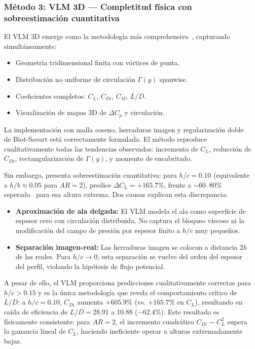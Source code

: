 \documentclass[twocolumn]{article}
\begin{document}
\subsubsection{Método 3: VLM 3D --- Completitud física con sobreestimación cuantitativa}

El VLM 3D emerge como la metodología más comprehensiva~\cite{katz2001}, capturando simultáneamente:

\begin{itemize}
\item Geometría tridimensional finita con vórtices de punta.
\item Distribución no uniforme de circulación $\Gamma(y)$ spanwise.
\item Coeficientes completos: $C_L$, $C_{Di}$, $C_M$, $L/D$.
\item Visualización de mapas 3D de $\Delta C_p$ y circulación.
\end{itemize}

La implementación con malla coseno, herraduras imagen y regularización doble de Biot-Savart está correctamente formulada. El método reproduce cualitativamente todas las tendencias observadas: incremento de $C_L$, reducción de $C_{Di}$, rectangularización de $\Gamma(y)$, y momento de encabritado.

Sin embargo, presenta sobreestimación cuantitativa: para $h/c = 0.10$ (equivalente a $h/b \approx 0.05$ para $AR = 2$), predice $\Delta C_L = +165.7\%$, frente a $\sim 60$--80\% esperado~\cite{zerihan2000} para esa altura extrema. Dos causas explican esta discrepancia:

\begin{itemize}
\item \textbf{Aproximación de ala delgada:} El VLM modela el ala como superficie de espesor cero con circulación distribuida. No captura el bloqueo viscoso ni la modificación del campo de presión por espesor finito a $h/c$ muy pequeños.
\item \textbf{Separación imagen-real:} Las herraduras imagen se colocan a distancia $2h$ de las reales. Para $h/c \to 0$, esta separación se vuelve del orden del espesor del perfil, violando la hipótesis de flujo potencial.
\end{itemize}

A pesar de ello, el VLM proporciona predicciones cualitativamente correctas para $h/c > 0.15$ y es la única metodología que revela el comportamiento crítico de $L/D$: a $h/c = 0.10$, $C_{Di}$ aumenta $+605.9\%$ (vs. $+165.7\%$ en $C_L$), resultando en caída de eficiencia de $L/D = 28.91$ a $10.88$ ($-62.4\%$). Este resultado es físicamente consistente: para $AR = 2$, el incremento cuadrático $C_{Di} \sim C_L^2$ supera la ganancia lineal de $C_L$, haciendo ineficiente operar a alturas extremadamente bajas.
\end{document}
